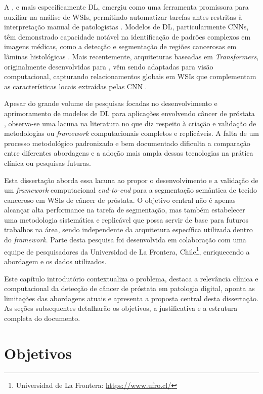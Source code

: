 A , e mais especificamente DL, emergiu como uma ferramenta promissora para auxiliar na análise de WSIs, permitindo automatizar tarefas antes restritas à interpretação manual de patologistas \cite{Litjens2017}. Modelos de DL, particularmente CNNs, têm demonstrado capacidade notável na identificação de padrões complexos em imagens médicas, como a detecção e segmentação de regiões cancerosas em lâminas histológicas \cite{Ciresan2012}. Mais recentemente, arquiteturas baseadas em \textit{Transformers}, originalmente desenvolvidas para , vêm sendo adaptadas para visão computacional, capturando relacionamentos globais em WSIs que complementam as características locais extraídas pelas CNN \cite{Dosovitskiy2021}.

Apesar do grande volume de pesquisas focadas no desenvolvimento e aprimoramento de modelos de DL para aplicações envolvendo câncer de próstata \cite{Rabilloud} , observa-se uma lacuna na literatura no que diz respeito à criação e validação de metodologias ou \textit{framework} computacionais completos e replicáveis. A falta de um processo metodológico padronizado e bem documentado dificulta a comparação entre diferentes abordagens e a adoção mais ampla dessas tecnologias na prática clínica ou pesquisas futuras.

Esta dissertação aborda essa lacuna ao propor o desenvolvimento e a validação de um \textit{framework} computacional \textit{end-to-end} para a segmentação semântica de tecido canceroso em WSIs de câncer de próstata. O objetivo central não é apenas alcançar alta performance na tarefa de segmentação, mas também estabelecer uma metodologia sistemática e replicável que possa servir de base para futuros trabalhos na área, sendo independente da arquitetura específica utilizada dentro do \textit{framework}. Parte desta pesquisa foi desenvolvida em colaboração com uma equipe de pesquisadores da Universidad de La Frontera, Chile\footnote{Universidad de La Frontera: \url{https://www.ufro.cl/}}, enriquecendo a abordagem e os dados utilizados.

Este capítulo introdutório contextualiza o problema, destaca a relevância clínica e computacional da detecção de câncer de próstata em patologia digital, aponta as limitações das abordagens atuais e apresenta a proposta central desta dissertação. As seções subsequentes detalharão os objetivos, a justificativa e a estrutura completa do documento.

\section{Objetivos}\label{sec:objetivos}

